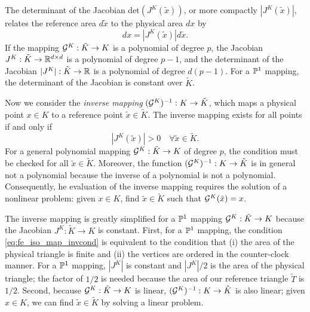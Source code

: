 The determinant of the Jacobian $\text{det}(J^K(\tilde x))$, or more compactly $|J^K(\tilde x)|$, relates the reference area $d \tilde x$ to the physical area $dx$ by
\begin{equation*}
  dx = |J^K(\tilde x)| d\tilde x.
\end{equation*}
If the mapping $\mathcal{G}^K: \tilde K \to K$ is a polynomial of degree $p$, the Jacobian $J^K: \tilde K \to \mathbb{R}^{d \times d}$ is a polynomial of degree $p-1$, and the determinant of the Jacobian $|J^K|: \tilde K \to \mathbb{R}$ is a polynomial of degree $d(p-1)$.  For a $\mathbb{P}^1$ mapping, the determinant of the Jacobian is constant over $\tilde K$.

Now we consider the \emph{inverse mapping} $(\mathcal{G}^K)^{-1}: K \to \tilde K$, which maps a physical point $x \in K$ to a reference point $\tilde x \in \tilde K$.  The inverse mapping exists for all points if and only if
\begin{equation}
  |J^K(\tilde x)| > 0 \quad \forall \tilde x \in \tilde K.
  \label{eq:fe_iso_map_invcond}
\end{equation}
For a general polynomial mapping $\mathcal{G}^K: \tilde K \to K$ of degree $p$, the condition must be checked for all $\tilde x \in \tilde K$. Moreover, the function $(\mathcal{G}^K)^{-1}: K \to \tilde K$ is in general not a polynomial because the inverse of a polynomial is not a polynomial.  Consequently, he evaluation of the inverse mapping requires the solution of a nonlinear problem: given $x \in K$, find $\tilde x \in \tilde K$ such that $\mathcal{G}^K(\tilde x) = x$.

The inverse mapping is greatly simplified for a $\mathbb{P}^1$ mapping $\mathcal{G}^K: \tilde K \to K$ because the Jacobian $J^K: \tilde K \to K$ is constant.  First, for a $\mathbb{P}^1$ mapping, the condition \eqref{eq:fe_iso_map_invcond} is equivalent to the condition that (i) the area of the physical triangle is finite and (ii) the vertices are ordered in the counter-clock manner.  For a $\mathbb{P}^1$ mapping, $|J^K|$ is constant and $|J^K|/2$ is the area of the physical triangle; the factor of $1/2$ is needed because the area of our reference triangle $\tilde T$ is $1/2$. Second, because $\mathcal{G}^K: \tilde K \to K$ is linear, $(\mathcal{G}^K)^{-1}: K \to \tilde K$ is also linear; given $x \in K$, we can find $\tilde x \in \tilde K$ by solving a linear problem. 


